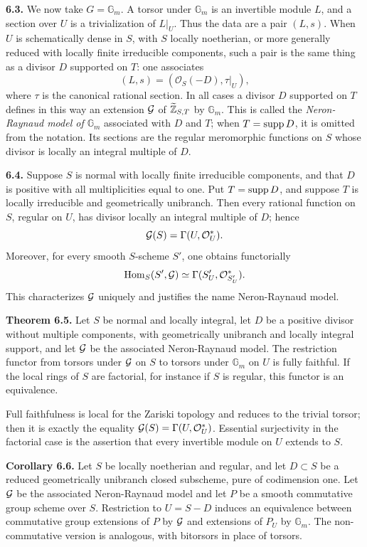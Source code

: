 \documentclass[11pt]{article}
\providecommand{\Gm}{\mathbb G_m}
\providecommand{\Hom}{\operatorname{Hom}}
\begin{document}
\textbf{6.3.}  We now take \(G=\Gm\).  A torsor under \(\Gm\) is an invertible module \(L\), and a section over \(U\) is a trivialization of \(L|_U\).  Thus the data are a pair \((L,s)\).  When \(U\) is schematically dense in \(S\), with \(S\) locally noetherian, or more generally reduced with locally finite irreducible components, such a pair is the same thing as a divisor \(D\) supported on \(T\): one associates
\[
  (L,s)=(\mathcal O_S(-D),\tau|_U),
\]
where \(\tau\) is the canonical rational section.  In all cases a divisor \(D\) supported on \(T\) defines in this way an extension \(\mathcal G\) of \(\widetilde{\mathbb Z}_{S,T}\) by \(\Gm\).  This is called the \emph{Neron-Raynaud model of \(\Gm\)} associated with \(D\) and \(T\); when \(T=\operatorname{supp} D\), it is omitted from the notation.  Its sections are the regular meromorphic functions on \(S\) whose divisor is locally an integral multiple of \(D\).

\textbf{6.4.}  Suppose \(S\) is normal with locally finite irreducible components, and that \(D\) is positive with all multiplicities equal to one.  Put \(T=\operatorname{supp} D\), and suppose \(T\) is locally irreducible and geometrically unibranch.  Then every rational function on \(S\), regular on \(U\), has divisor locally an integral multiple of \(D\); hence
\[
  \mathcal G(S)=\Gamma(U,\mathcal O_U^*).
\]
Moreover, for every smooth \(S\)-scheme \(S'\), one obtains functorially
\[
  \Hom_S(S',\cG)\simeq \Gamma(S'_U,\mathcal O^*_{S'_U}).
\]
This characterizes \(\mathcal G\) uniquely and justifies the name Neron-Raynaud model.

\textbf{Theorem 6.5.}  Let \(S\) be normal and locally integral, let \(D\) be a positive divisor without multiple components, with geometrically unibranch and locally integral support, and let \(\mathcal G\) be the associated Neron-Raynaud model.  The restriction functor from torsors under \(\mathcal G\) on \(S\) to torsors under \(\Gm\) on \(U\) is fully faithful.  If the local rings of \(S\) are factorial, for instance if \(S\) is regular, this functor is an equivalence.

Full faithfulness is local for the Zariski topology and reduces to the trivial torsor; then it is exactly the equality \(\mathcal G(S)=\Gamma(U,\mathcal O_U^*)\).  Essential surjectivity in the factorial case is the assertion that every invertible module on \(U\) extends to \(S\).

\textbf{Corollary 6.6.}  Let \(S\) be locally noetherian and regular, and let \(D\subset S\) be a reduced geometrically unibranch closed subscheme, pure of codimension one.  Let \(\mathcal G\) be the associated Neron-Raynaud model and let \(P\) be a smooth commutative group scheme over \(S\).  Restriction to \(U=S-D\) induces an equivalence between commutative group extensions of \(P\) by \(\mathcal G\) and extensions of \(P_U\) by \(\Gm\).  The non-commutative version is analogous, with bitorsors in place of torsors.
\end{document}
